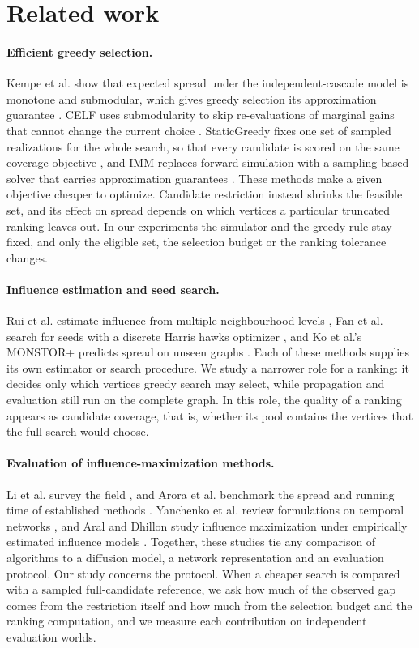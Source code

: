 \documentclass[smallextended]{svjour3}
\begin{document}
\section{Related work}
\paragraph{Efficient greedy selection.} Kempe et al. show that expected spread under the independent-cascade model is monotone and submodular, which gives greedy selection its approximation guarantee \cite{ref1}. CELF uses submodularity to skip re-evaluations of marginal gains that cannot change the current choice \cite{ref7}. StaticGreedy fixes one set of sampled realizations for the whole search, so that every candidate is scored on the same coverage objective \cite{ref8}, and IMM replaces forward simulation with a sampling-based solver that carries approximation guarantees \cite{ref2}. These methods make a given objective cheaper to optimize. Candidate restriction instead shrinks the feasible set, and its effect on spread depends on which vertices a particular truncated ranking leaves out. In our experiments the simulator and the greedy rule stay fixed, and only the eligible set, the selection budget or the ranking tolerance changes.

\paragraph{Influence estimation and seed search.} Rui et al. estimate influence from multiple neighbourhood levels \cite{ref12}, Fan et al. search for seeds with a discrete Harris hawks optimizer \cite{ref13}, and Ko et al.'s MONSTOR+ predicts spread on unseen graphs \cite{ref19}. Each of these methods supplies its own estimator or search procedure. We study a narrower role for a ranking: it decides only which vertices greedy search may select, while propagation and evaluation still run on the complete graph. In this role, the quality of a ranking appears as candidate coverage, that is, whether its pool contains the vertices that the full search would choose.

\paragraph{Evaluation of influence-maximization methods.} Li et al. survey the field \cite{ref9}, and Arora et al. benchmark the spread and running time of established methods \cite{ref16}. Yanchenko et al. review formulations on temporal networks \cite{ref11}, and Aral and Dhillon study influence maximization under empirically estimated influence models \cite{ref15}. Together, these studies tie any comparison of algorithms to a diffusion model, a network representation and an evaluation protocol. Our study concerns the protocol. When a cheaper search is compared with a sampled full-candidate reference, we ask how much of the observed gap comes from the restriction itself and how much from the selection budget and the ranking computation, and we measure each contribution on independent evaluation worlds.
\end{document}

